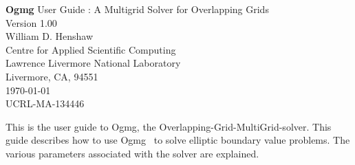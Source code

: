 \documentclass{article}
\begin{document}

\newcommand{\ogen}{\homeHenshaw/res/ogen}
\newcommand{\figures}{\homeHenshaw/Overture/docFigures}
\newcommand{\automg}{\homeHenshaw/papers/automg}
\newcommand{\ogmgDir}{\homeHenshaw/Overture/ogmg}

\newcommand{\Ogen}{{Ogen}}
\newcommand{\Overture}{{Overture}}
\newcommand{\Ogmg}{{Ogmg}}
\newcommand{\tablefontsize}{\footnotesize}




\baselineskip
\begin{flushleft}
{\Large
{\bf Ogmg} User Guide : A Multigrid Solver for Overlapping Grids \\
Version 1.00 \\
}
\vspace{3\baselineskip}
William D. Henshaw   \\                    
\vspace{2\baselineskip}
Centre for Applied Scientific Computing \\
Lawrence Livermore National Laboratory    \\
Livermore, CA, 94551   \\
\vspace{2\baselineskip}
\today\\
\vspace{\baselineskip}
UCRL-MA-134446


\vspace{4\baselineskip}

This is the user guide to \Ogmg, the Overlapping-Grid-MultiGrid-solver. This guide
describes how to use \Ogmg~ to solve elliptic boundary value problems. The various
parameters associated with the solver are explained.



\end{flushleft}
\end{document}
